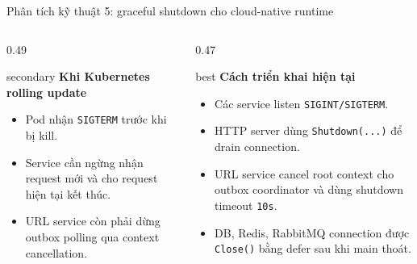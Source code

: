 \documentclass[aspectratio=169]{beamer}
\begin{document}
\begin{frame}{Phân tích kỹ thuật 5: graceful shutdown cho cloud-native runtime}
    \begin{columns}[T,onlytextwidth]
        \begin{column}{0.49\textwidth}
            \begin{claimbox}{secondary}
                \textbf{Khi Kubernetes rolling update}
                \begin{itemize}\small
                    \item Pod nhận \texttt{SIGTERM} trước khi bị kill.
                    \item Service cần ngừng nhận request mới và cho request hiện tại kết thúc.
                    \item URL service còn phải dừng outbox polling qua context cancellation.
                \end{itemize}
            \end{claimbox}
        \end{column}
        \begin{column}{0.47\textwidth}
            \begin{claimbox}{best}
                \textbf{Cách triển khai hiện tại}
                \begin{itemize}\small
                    \item Các service listen \texttt{SIGINT/SIGTERM}.
                    \item HTTP server dùng \texttt{Shutdown(...)} để drain connection.
                    \item URL service cancel root context cho outbox coordinator và dùng shutdown timeout \texttt{10s}.
                    \item DB, Redis, RabbitMQ connection được \texttt{Close()} bằng defer sau khi main thoát.
                \end{itemize}
            \end{claimbox}
        \end{column}
    \end{columns}
\end{frame}
\end{document}

